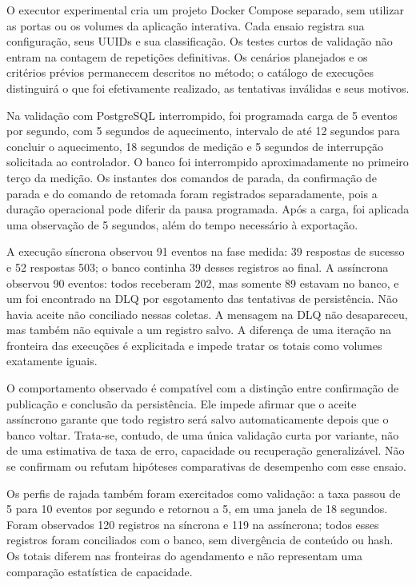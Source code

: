 O executor experimental cria um projeto Docker Compose separado, sem utilizar as portas ou os volumes da aplicação interativa. Cada ensaio registra sua configuração, seus UUIDs e sua classificação. Os testes curtos de validação não entram na contagem de repetições definitivas. Os cenários planejados e os critérios prévios permanecem descritos no método; o catálogo de execuções distinguirá o que foi efetivamente realizado, as tentativas inválidas e seus motivos.

Na validação com PostgreSQL interrompido, foi programada carga de 5 eventos por segundo, com 5 segundos de aquecimento, intervalo de até 12 segundos para concluir o aquecimento, 18 segundos de medição e 5 segundos de interrupção solicitada ao controlador. O banco foi interrompido aproximadamente no primeiro terço da medição. Os instantes dos comandos de parada, da confirmação de parada e do comando de retomada foram registrados separadamente, pois a duração operacional pode diferir da pausa programada. Após a carga, foi aplicada uma observação de 5 segundos, além do tempo necessário à exportação.

A execução síncrona observou 91 eventos na fase medida: 39 respostas de sucesso e 52 respostas 503; o banco continha 39 desses registros ao final. A assíncrona observou 90 eventos: todos receberam 202, mas somente 89 estavam no banco, e um foi encontrado na DLQ por esgotamento das tentativas de persistência. Não havia aceite não conciliado nessas coletas. A mensagem na DLQ não desapareceu, mas também não equivale a um registro salvo. A diferença de uma iteração na fronteira das execuções é explicitada e impede tratar os totais como volumes exatamente iguais.

O comportamento observado é compatível com a distinção entre confirmação de publicação e conclusão da persistência. Ele impede afirmar que o aceite assíncrono garante que todo registro será salvo automaticamente depois que o banco voltar. Trata-se, contudo, de uma única validação curta por variante, não de uma estimativa de taxa de erro, capacidade ou recuperação generalizável. Não se confirmam ou refutam hipóteses comparativas de desempenho com esse ensaio.

Os perfis de rajada também foram exercitados como validação: a taxa passou de 5 para 10 eventos por segundo e retornou a 5, em uma janela de 18 segundos. Foram observados 120 registros na síncrona e 119 na assíncrona; todos esses registros foram conciliados com o banco, sem divergência de conteúdo ou hash. Os totais diferem nas fronteiras do agendamento e não representam uma comparação estatística de capacidade.

